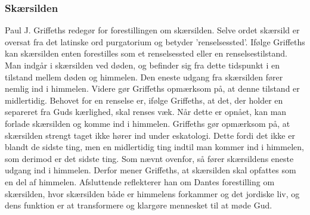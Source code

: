 \subsubsection{Skærsilden}
Paul J. Griffeths redegør for forestillingen om skærsilden. Selve ordet skærsild er oversat fra det latinske ord purgatorium og betyder ’renselsessted’. Ifølge Griffeths kan skærsilden enten forestilles som et renselsessted eller en renselsestilstand. Man indgår i skærsilden ved døden, og befinder sig fra dette tidspunkt i en tilstand mellem døden og himmelen. Den eneste udgang fra skærsilden fører nemlig ind i himmelen. Videre gør Griffeths opmærksom på, at denne tilstand er midlertidig. Behovet for en renselse er, ifølge Griffeths, at det, der holder en separeret fra Guds kærlighed, skal renses væk. Når dette er opnået, kan man forlade skærsilden og komme ind i himmelen. Griffeths gør opmærksom på, at skærsilden strengt taget ikke hører ind under eskatologi. Dette fordi det ikke er blandt de sidste ting, men en midlertidig ting indtil man kommer ind i himmelen, som derimod er det sidste ting. 
Som nævnt ovenfor, så fører skærsildens eneste udgang ind i himmelen. Derfor mener Griffeths, at skærsilden skal opfattes som en del af himmelen. Afsluttende reflekterer han om Dantes forestilling om skærsilden, hvor skærsilden både er himmelens forkammer og det jordiske liv, og dens funktion er at transformere og klargøre mennesket til at møde Gud.

